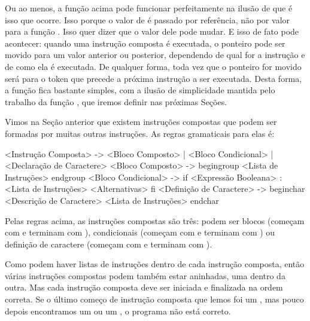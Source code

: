 Ou ao menos, a função acima pode funcionar perfeitamente na ilusão de
que é isso que ocorre. Isso porque o valor de  é
passado por referência, não por valor para a
função . Isso quer dizer que o valor dele
pode mudar. E isso de fato pode acontecer: quando uma instrução
composta é executada, o ponteiro pode ser movido para um valor
anterior ou posterior, dependendo de qual for a instrução e de como
ela é executada. De qualquer forma, toda vez que o ponteiro for movido
será para o token que precede a próxima instrução a ser
executada. Desta forma, a
função  fica bastante simples,
com a ilusão de simplicidade mantida pelo trabalho da
função , que iremos definir nas próximas
Seções.



Vimos na Seção anterior que existem instruções compostas que podem ser
formadas por muitas outras instruções. As regras gramaticais para elas é:

\alinhaverbatim
<Instrução Composta> -> <Bloco Composto> |
                        <Bloco Condicional> |
                        <Declaração de Caractere>
<Bloco Composto> -> begingroup <Lista de Instruções> endgroup
<Bloco Condicional> -> if <Expressão Booleana> :
                         <Lista de Instruções>
                         <Alternativas>
                       fi
<Definição de Caractere> -> beginchar <Descrição de Caractere>
                              <Lista de Instruções>
                            endchar
\alinhanormal

Pelas regras acima, as instruções compostas são três: podem ser
blocos (começam com  e terminam
com ), condicionais (começam com 
e terminam com ) ou definição de caractere (começam
com  e terminam com ).

Como podem haver listas de instruções dentro de cada instrução
composta, então várias instruções compostas podem também estar
aninhadas, uma dentro da outra. Mas cada instrução composta deve ser
iniciada e finalizada na ordem correta. Se o último começo de
instrução composta que lemos foi um , mas
pouco depois encontramos um  ou
um , o programa não está correto.

